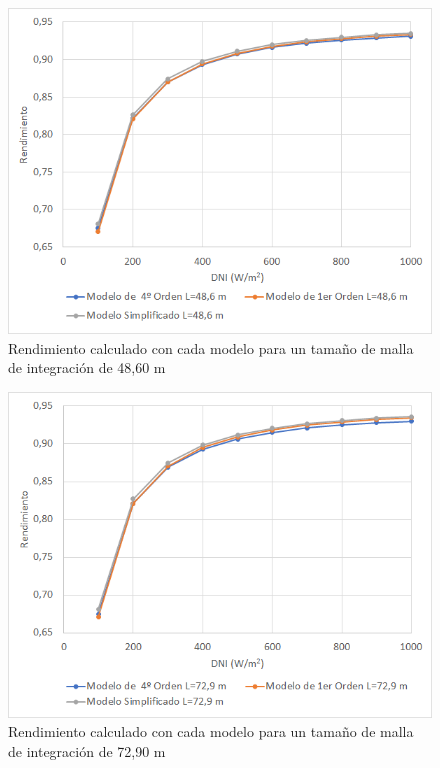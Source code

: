 \begin{figure}[h!]
\includegraphics[width=0.9\linewidth]{images/malla4860.png}
\caption{Rendimiento calculado con cada modelo para un tamaño de malla de integración de 48,60 m} 
\label{fig:malla4860}
\end{figure}

\begin{figure}[h!]
\includegraphics[width=0.9\linewidth]{images/malla7290.png}
\caption{Rendimiento calculado con cada modelo para un tamaño de malla de integración de 72,90 m} 
\label{fig:malla7290}
\end{figure}

